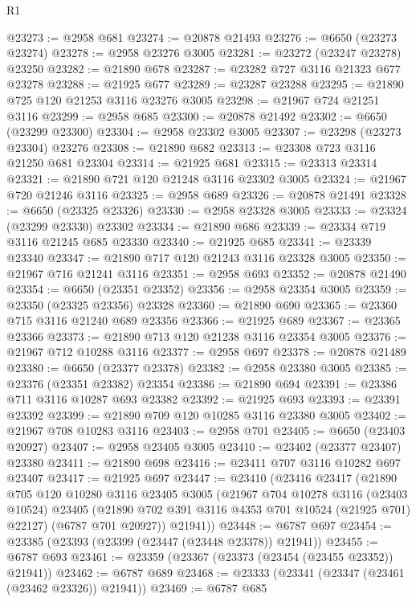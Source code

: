 \begin{lexlean}{R1}
\begin{coremodule}
@23273 := @2958 @681
@23274 := @20878 @21493
@23276 := @6650 (@23273 @23274)
@23278 := @2958 @23276 @3005
@23281 := @23272 (@23247 @23278) @23250
@23282 := @21890 @678
@23287 := @23282 @727 @3116 @21323 @677 @23278
@23288 := @21925 @677
@23289 := @23287 @23288
@23295 := @21890 @725 @120 @21253 @3116 @23276 @3005
@23298 := @21967 @724 @21251 @3116
@23299 := @2958 @685
@23300 := @20878 @21492
@23302 := @6650 (@23299 @23300)
@23304 := @2958 @23302 @3005
@23307 := @23298 (@23273 @23304) @23276
@23308 := @21890 @682
@23313 := @23308 @723 @3116 @21250 @681 @23304
@23314 := @21925 @681
@23315 := @23313 @23314
@23321 := @21890 @721 @120 @21248 @3116 @23302 @3005
@23324 := @21967 @720 @21246 @3116
@23325 := @2958 @689
@23326 := @20878 @21491
@23328 := @6650 (@23325 @23326)
@23330 := @2958 @23328 @3005
@23333 := @23324 (@23299 @23330) @23302
@23334 := @21890 @686
@23339 := @23334 @719 @3116 @21245 @685 @23330
@23340 := @21925 @685
@23341 := @23339 @23340
@23347 := @21890 @717 @120 @21243 @3116 @23328 @3005
@23350 := @21967 @716 @21241 @3116
@23351 := @2958 @693
@23352 := @20878 @21490
@23354 := @6650 (@23351 @23352)
@23356 := @2958 @23354 @3005
@23359 := @23350 (@23325 @23356) @23328
@23360 := @21890 @690
@23365 := @23360 @715 @3116 @21240 @689 @23356
@23366 := @21925 @689
@23367 := @23365 @23366
@23373 := @21890 @713 @120 @21238 @3116 @23354 @3005
@23376 := @21967 @712 @10288 @3116
@23377 := @2958 @697
@23378 := @20878 @21489
@23380 := @6650 (@23377 @23378)
@23382 := @2958 @23380 @3005
@23385 := @23376 (@23351 @23382) @23354
@23386 := @21890 @694
@23391 := @23386 @711 @3116 @10287 @693 @23382
@23392 := @21925 @693
@23393 := @23391 @23392
@23399 := @21890 @709 @120 @10285 @3116 @23380 @3005
@23402 := @21967 @708 @10283 @3116
@23403 := @2958 @701
@23405 := @6650 (@23403 @20927)
@23407 := @2958 @23405 @3005
@23410 := @23402 (@23377 @23407) @23380
@23411 := @21890 @698
@23416 := @23411 @707 @3116 @10282 @697 @23407
@23417 := @21925 @697
@23447 := @23410
    (@23416
      @23417
      (@21890
        @705
        @120
        @10280
        @3116
        @23405
        @3005
        (@21967
          @704
          @10278
          @3116
          (@23403 @10524)
          @23405
          (@21890 @702 @391 @3116 @4353 @701 @10524 (@21925 @701) @22127)
          (@6787 @701 @20927))
        @21941))
@23448 := @6787 @697
@23454 := @23385 (@23393 (@23399 (@23447 (@23448 @23378)) @21941))
@23455 := @6787 @693
@23461 := @23359 (@23367 (@23373 (@23454 (@23455 @23352)) @21941))
@23462 := @6787 @689
@23468 := @23333 (@23341 (@23347 (@23461 (@23462 @23326)) @21941))
@23469 := @6787 @685

\end{coremodule}
\end{lexlean}
